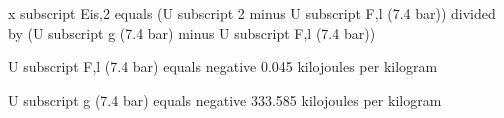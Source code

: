 x subscript Eis,2 equals (U subscript 2 minus U subscript F,l (7.4 bar)) divided by (U subscript g (7.4 bar) minus U subscript F,l (7.4 bar))  

U subscript F,l (7.4 bar) equals negative 0.045 kilojoules per kilogram  

U subscript g (7.4 bar) equals negative 333.585 kilojoules per kilogram